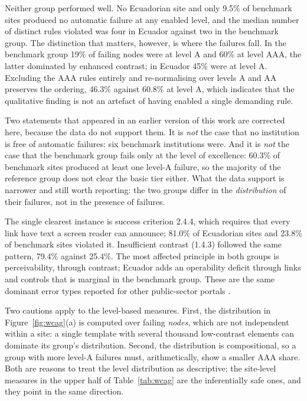 \documentclass[pdflatex,sn-basic,Numbered]{sn-jnl}
\theoremstyle{thmstyleone}
\theoremstyle{thmstyletwo}
\theoremstyle{thmstylethree}
\begin{document}
Neither group performed well. No Ecuadorian site and only 9.5\% of benchmark sites produced no automatic failure at any enabled level, and the median number of distinct rules violated was four in Ecuador against two in the benchmark group. The distinction that matters, however, is where the failures fall. In the benchmark group 19\% of failing nodes were at level A and 60\% at level AAA, the latter dominated by enhanced contrast; in Ecuador 45\% were at level A. Excluding the AAA rules entirely and re-normalising over levels A and AA preserves the ordering, 46.3\% against 60.8\% at level A, which indicates that the qualitative finding is not an artefact of having enabled a single demanding rule.

Two statements that appeared in an earlier version of this work are corrected here, because the data do not support them. It is \emph{not} the case that no institution is free of automatic failures: six benchmark institutions were. And it is \emph{not} the case that the benchmark group fails only at the level of excellence: 60.3\% of benchmark sites produced at least one level-A failure, so the majority of the reference group does not clear the basic tier either. What the data support is narrower and still worth reporting: the two groups differ in the \emph{distribution} of their failures, not in the presence of failures.

The single clearest instance is success criterion 2.4.4, which requires that every link have text a screen reader can announce; 81.0\% of Ecuadorian sites and 23.8\% of benchmark sites violated it. Insufficient contrast (1.4.3) followed the same pattern, 79.4\% against 25.4\%. The most affected principle in both groups is perceivability, through contrast; Ecuador adds an operability deficit through links and controls that is marginal in the benchmark group. These are the same dominant error types reported for other public-sector portals \citep{iniesto2025service,aljedaani2025egovernment}.

Two cautions apply to the level-based measures. First, the distribution in Figure~\ref{fig:wcag}(a) is computed over failing \emph{nodes}, which are not independent within a site: a single template with several thousand low-contrast elements can dominate its group's distribution. Second, the distribution is compositional, so a group with more level-A failures must, arithmetically, show a smaller AAA share. Both are reasons to treat the level distribution as descriptive; the site-level measures in the upper half of Table~\ref{tab:wcag} are the inferentially safe ones, and they point in the same direction.
\end{document}
